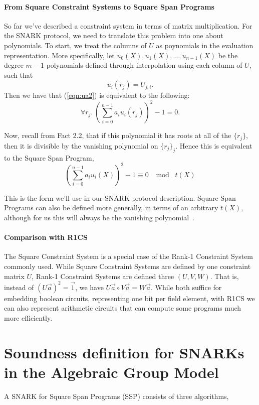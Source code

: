 \documentclass{article}
\theoremstyle{definition}
\theoremstyle{remark}
\begin{document}
\paragraph{From Square Constraint Systems to Square Span Programs}
So far we've described a constraint system in terms of matrix multiplication.
For the SNARK protocol, we need to translate this problem into one about polynomials.
%
To start, we treat the columns of $U$ as poynomials in the evaluation representation.
More specifically, let $u_0(X),u_1(X),...,u_{n-1}(X)$ be the degree $m-1$ polynomials defined through interpolation using each column of $U$, such that
    $$u_i(r_j)=U_{j,i}.$$
Then we have that (\ref{eqn:ua2}) is equivalent to the following:
\begin{equation}
\label{eqn:span}
\displaystyle \forall r_j. ~ \left(\sum_{i=0}^{n-1} a_i u_i(r_j) \right)^2 - 1 = 0.
\end{equation}

Now, recall from Fact 2.2, that if this polynomial it has roots at all of the $\{r_j\}$, then it is divisible by the vanishing polynomial on $\{r_j\}_j$.
Hence this is equivalent to the Square Span Program,
\begin{equation}
 \left(\sum_{i=0}^{n-1} a_i u_i(X) \right)^2 - 1 \equiv 0 \,\, \mod \,\, t(X)
\end{equation}

This is the form we'll use in our SNARK protocol description.
Square Span Programs can also be defined more generally, in terms of an arbitrary $t(X)$, although for us this will always be the vanishing polynomial~\cite{squarespan}.

\paragraph{Comparison with R1CS}
The Square Constraint System is a special case of the Rank-1 Constraint System commonly used.
While Square Constraint Systems are defined by one constraint matrix $U$, Rank-1 Constraint Systems are defined three $(U,V,W)$. 
That is, instead of $\left(U\vec{a}\right)^2=\vec{1}$, we have $U\vec{a} \circ V\vec{a} = W\vec{a}$. 
While both suffice for embedding boolean circuits, representing one bit per field element, with R1CS we can also represent arithmetic circuits that can compute some programs much more efficiently.

\section{Soundness definition for SNARKs in the Algebraic Group Model} 
A SNARK for Square Span Programs (SSP) consists of three algorithms,
\end{document}

